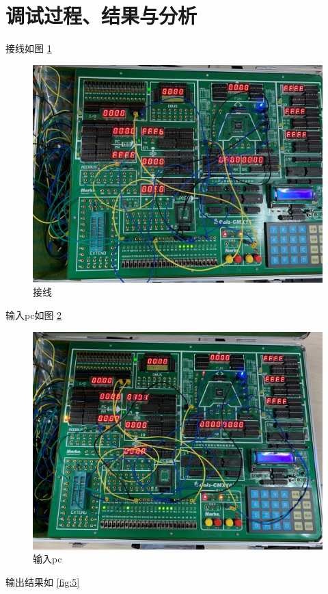 \documentclass[a4paper,10pt,UTF8]{paper}
\numberwithin{equation}{section}
\numberwithin{figure}{section}
\begin{document}
\section{调试过程、结果与分析}

接线如图 \ref{fig:3}

\begin{figure}[h]
  \centering
  \includegraphics[width=0.8\linewidth]{3.jpg}
  \caption{接线}
  \label{fig:3}
\end{figure}

输入pc如图 \ref{fig:4}

\begin{figure}[h]
  \centering
  \includegraphics[width=0.8\linewidth]{4.jpg}
  \caption{ 输入pc}
  \label{fig:4}
\end{figure}

输出结果如 \ref{fig:5}
\end{document}
